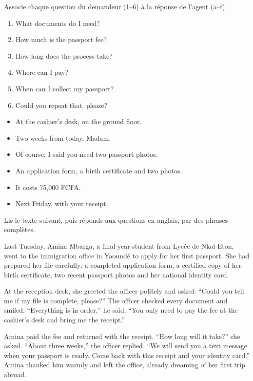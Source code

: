 \documentclass[11pt]{article}
\newcounter{popsec}
\newcounter{popsub}
\newcommand{\courssub}[1]{%
  \stepcounter{popsub}%
  \par\vspace{9pt}\noindent{\popxbold\fontsize{11.5}{13}\selectfont\color{popink}{\color{poporange}\thepopsec.\thepopsub}\hspace{6pt}#1}\par\nopagebreak\vspace{4pt}
}
\begin{document}
\begin{exercice}
Associe chaque question du demandeur (1--6) à la réponse de l'agent (a--f).
\begin{enumerate}
\item What documents do I need?
\item How much is the passport fee?
\item How long does the process take?
\item Where can I pay?
\item When can I collect my passport?
\item Could you repeat that, please?
\end{enumerate}
\begin{itemize}
\item[a)] At the cashier's desk, on the ground floor.
\item[b)] Two weeks from today, Madam.
\item[c)] Of course: I said you need two passport photos.
\item[d)] An application form, a birth certificate and two photos.
\item[e)] It costs 75,000 FCFA.
\item[f)] Next Friday, with your receipt.
\end{itemize}
\end{exercice}

\courssub{Je me prépare au Bac}

\begin{exercice}
Lis le texte suivant, puis réponds aux questions en anglais, par des phrases complètes.
\end{exercice}

\begin{textebox}
Last Tuesday, Amina Mbarga, a final-year student from Lycée de Nkol-Eton, went to the immigration office in Yaoundé to apply for her first passport. She had prepared her file carefully: a completed application form, a certified copy of her birth certificate, two recent passport photos and her national identity card.

At the reception desk, she greeted the officer politely and asked: “Could you tell me if my file is complete, please?” The officer checked every document and smiled. “Everything is in order,” he said. “You only need to pay the fee at the cashier's desk and bring me the receipt.”

Amina paid the fee and returned with the receipt. “How long will it take?” she asked. “About three weeks,” the officer replied. “We will send you a text message when your passport is ready. Come back with this receipt and your identity card.” Amina thanked him warmly and left the office, already dreaming of her first trip abroad.
\end{textebox}
\end{document}
